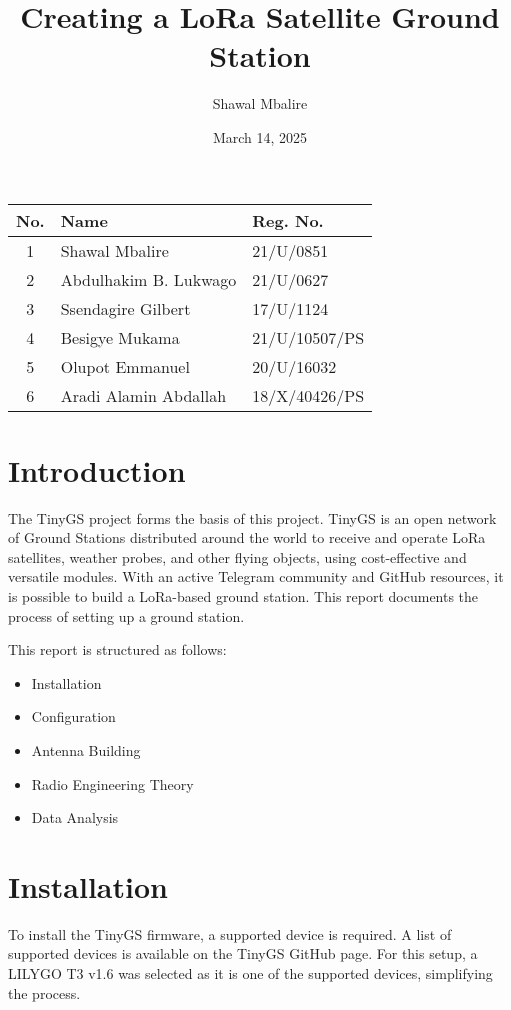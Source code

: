 \documentclass{article}
\title{Creating a LoRa Satellite Ground Station}
\author{Shawal Mbalire}
\date{March 14, 2025}
\begin{document}
\maketitle

\begin{center}
    \renewcommand{\arraystretch}{1.5} %
    \begin{tabular}{|c|l|l|}
        \hline
        \textbf{No.} & \textbf{Name} & \textbf{Reg. No.} \\
        \hline
        1 & Shawal Mbalire & 21/U/0851 \\
        \hline
        2 & Abdulhakim B. Lukwago & 21/U/0627 \\
        \hline
        3 & Ssendagire Gilbert & 17/U/1124 \\
        \hline
        4 & Besigye Mukama & 21/U/10507/PS \\
        \hline
        5 & Olupot Emmanuel & 20/U/16032 \\
        \hline
        6 & Aradi Alamin Abdallah & 18/X/40426/PS \\
        \hline
    \end{tabular}
\end{center}



\section{Introduction}
The TinyGS project \cite{tinygs} forms the basis of this project. TinyGS is an open network of Ground Stations distributed around the world to receive and operate LoRa satellites, weather probes, and other flying objects, using cost-effective and versatile modules. With an active Telegram community and GitHub resources, it is possible to build a LoRa-based ground station. This report documents the process of setting up a ground station.

This report is structured as follows:
\begin{itemize}
    \item Installation
    \item Configuration
    \item Antenna Building
    \item Radio Engineering Theory
    \item Data Analysis
\end{itemize}

\section{Installation}
To install the TinyGS firmware, a supported device is required. A list of supported devices is available on the TinyGS GitHub page. For this setup, a LILYGO T3 v1.6 was selected as it is one of the supported devices, simplifying the process.
\end{document}
